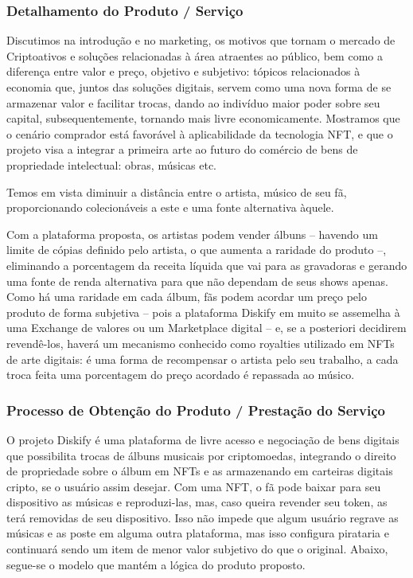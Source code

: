 \documentclass[onecolumn,12pt]{asme2ej}
\begin{document}
\subsubsection{Detalhamento do Produto / Serviço}

Discutimos na introdução e no marketing, os motivos que tornam o mercado de Criptoativos e soluções relacionadas à área atraentes ao público, bem como a diferença entre valor e preço, objetivo e subjetivo: tópicos relacionados à economia que, juntos das soluções digitais, servem como uma nova forma de se armazenar valor e facilitar trocas, dando ao indivíduo maior poder sobre seu capital, subsequentemente, tornando mais livre economicamente. Mostramos que o cenário comprador está favorável à aplicabilidade da tecnologia NFT, e que o projeto visa a integrar a primeira arte ao futuro do comércio de bens de propriedade intelectual: obras, músicas etc. 

Temos em vista diminuir a distância entre o artista, músico de seu fã, proporcionando colecionáveis a este e uma fonte alternativa àquele.

Com a plataforma proposta, os artistas podem vender álbuns – havendo um limite de cópias definido pelo artista, o que aumenta a raridade do produto –, eliminando a porcentagem da receita líquida que vai para as gravadoras e gerando uma fonte de renda alternativa para que não dependam de seus shows apenas. Como há uma raridade em cada álbum, fãs podem acordar um preço pelo produto de forma subjetiva – pois a plataforma Diskify em muito se assemelha à uma Exchange de valores ou um Marketplace digital – e, se a posteriori decidirem revendê-los, haverá um mecanismo conhecido como royalties utilizado em NFTs de arte digitais: é uma forma de recompensar o artista pelo seu trabalho, a cada troca feita uma porcentagem do preço acordado é repassada ao músico. 

\subsubsection{Processo de Obtenção do Produto / Prestação do Serviço}

O projeto Diskify é uma plataforma de livre acesso e negociação de bens digitais que possibilita trocas de álbuns musicais por criptomoedas, integrando o direito de propriedade sobre o álbum em NFTs e as armazenando em carteiras digitais cripto, se o usuário assim desejar. Com uma NFT, o fã pode baixar para seu dispositivo as músicas e reproduzi-las, mas, caso queira revender seu token, as terá removidas de seu dispositivo. Isso não impede que algum usuário regrave as músicas e as poste em alguma outra plataforma, mas isso configura pirataria e continuará sendo um item de menor valor subjetivo do que o original. Abaixo, segue-se o modelo que mantém a lógica do produto proposto.
\end{document}
